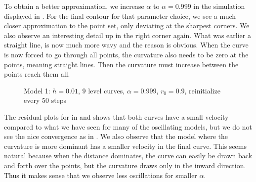 To obtain a better approximation, we increase $\alpha$ to $\alpha=0.999$ in the simulation displayed in . For the final contour for that parameter choice, we see a much closer approximation to the point set, only deviating at the sharpest corners. We also observe an interesting detail up in the right corner again. What was earlier a straight line, is now much more wavy and the reason is obvious. When the curve is now forced to go through all points, the curvature also needs to be zero at the points, meaning straight lines. Then the curvature must increase between the points reach them all. 
\begin{figure}
\begin{center}
\end{center}
\vspace{-2.5em}
\caption[Model 1 - Irregular and dense point set, $\alpha=0.999$]{Model 1: $h=0.01$, $9$ level curves, $\alpha=0.999$, $r_0=0.9$, reinitialize every $50$ steps}
\label{fig:m1-manypoints-a999}
\end{figure}

The residual plots for in  and  shows that both curves have a small velocity compared to what we have seen for many of the oscillating models, but we do not see the nice convergence as in . We also observe that the model where the curvature is more dominant has a smaller velocity in the final curve. This seems natural because when the distance dominates, the curve can easily be drawn back and forth over the points, but the curvature draws only in the inward direction. Thus it makes sense that we observe less oscillations for smaller $\alpha$. 


